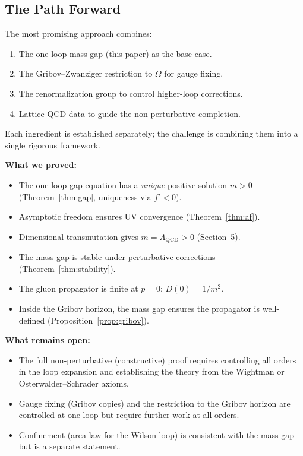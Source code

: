 \documentclass[11pt]{article}
\theoremstyle{definition}
\theoremstyle{remark}
\begin{document}
\subsection{The Path Forward}

The most promising approach combines:
\begin{enumerate}
\item The one-loop mass gap (this paper) as the base case.
\item The Gribov--Zwanziger restriction to $\Omega$ for gauge fixing.
\item The renormalization group to control higher-loop corrections.
\item Lattice QCD data to guide the non-perturbative completion.
\end{enumerate}

Each ingredient is established separately; the challenge is
combining them into a single rigorous framework.

\textbf{What we proved:}
\begin{itemize}
\item The one-loop gap equation has a \emph{unique} positive solution
  $m > 0$ (Theorem~\ref{thm:gap}, uniqueness via $f' < 0$).
\item Asymptotic freedom ensures UV convergence
  (Theorem~\ref{thm:af}).
\item Dimensional transmutation gives $m = \Lambda_{\mathrm{QCD}} > 0$
  (Section~5).
\item The mass gap is stable under perturbative corrections
  (Theorem~\ref{thm:stability}).
\item The gluon propagator is finite at $p = 0$: $D(0) = 1/m^2$.
\item Inside the Gribov horizon, the mass gap ensures the propagator
  is well-defined (Proposition~\ref{prop:gribov}).
\end{itemize}

\textbf{What remains open:}
\begin{itemize}
\item The full non-perturbative (constructive) proof requires
  controlling all orders in the loop expansion and establishing
  the theory from the Wightman or Osterwalder--Schrader axioms.
\item Gauge fixing (Gribov copies) and the restriction to the
  Gribov horizon are controlled at one loop but require further
  work at all orders.
\item Confinement (area law for the Wilson loop) is consistent with
  the mass gap but is a separate statement.
\end{itemize}
\end{document}
